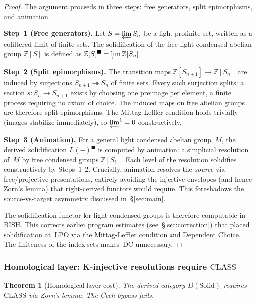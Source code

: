 \documentclass[12pt, a4paper]{article}
\theoremstyle{plain}
\newtheorem{theorem}{Theorem}[section]
\theoremstyle{definition}
\theoremstyle{remark}
\newcommand{\BISH}{\mathrm{BISH}}
\newcommand{\LPO}{\mathrm{LPO}}
\newcommand{\CLASS}{\mathrm{CLASS}}
\newcommand{\DC}{\mathrm{DC}}
\begin{document}
\begin{proof}
The argument proceeds in three steps: free generators, split
epimorphisms, and animation.

\medskip\noindent\textbf{Step~1 (Free generators).}
Let $S = \varprojlim S_n$ be a light profinite set, written as a
cofiltered limit of finite sets.  The solidification of the free
light condensed abelian group $\mathbb{Z}[S]$ is defined as
$\mathbb{Z}[S]^\blacksquare = \varprojlim \mathbb{Z}[S_n]$.

\medskip\noindent\textbf{Step~2 (Split epimorphisms).}
The transition maps $\mathbb{Z}[S_{n+1}] \to \mathbb{Z}[S_n]$ are
induced by surjections $S_{n+1} \twoheadrightarrow S_n$ of finite
sets.  Every such surjection splits: a section $s \colon S_n \to
S_{n+1}$ exists by choosing one preimage per element, a finite
process requiring no axiom of choice.  The induced maps on free
abelian groups are therefore split epimorphisms.  The Mittag-Leffler
condition holds trivially (images stabilize immediately), so
$\varprojlim^1 = 0$ constructively.

\medskip\noindent\textbf{Step~3 (Animation).}
For a general light condensed abelian group~$M$, the derived
solidification $L(-)^\blacksquare$ is computed by animation: a
simplicial resolution of~$M$ by free condensed groups
$\mathbb{Z}[S_i]$.  Each level of the resolution solidifies
constructively by Steps~1--2.  Crucially, animation resolves the
\emph{source} via free/projective presentations, entirely avoiding
the injective envelopes (and hence Zorn's lemma) that right-derived
functors would require.  This foreshadows the source-vs-target
asymmetry discussed in~\S\ref{sec:main}.

\medskip
The solidification functor for light condensed groups is therefore
computable in~$\BISH$.  This corrects earlier program estimates
(see~\S\ref{sec:correction}) that placed solidification at~$\LPO$
via the Mittag-Leffler condition and Dependent Choice.  The
finiteness of the index sets makes~$\DC$ unnecessary.
\end{proof}

\subsubsection{Homological layer: K-injective resolutions
require $\CLASS$}

\begin{theorem}[Homological layer cost]\label{thm:homological}
The derived category $D(\mathrm{Solid})$ requires $\CLASS$ via
Zorn's lemma.  The \v{C}ech bypass fails.
\end{theorem}
\end{document}
